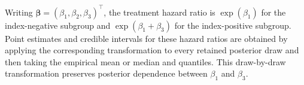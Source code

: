 Writing $\boldsymbol\beta=(\beta_1,\beta_2,\beta_3)^\top$, the treatment
hazard ratio is $\exp(\beta_1)$ for the index-negative subgroup and
$\exp(\beta_1+\beta_3)$ for the index-positive subgroup. Point estimates and
credible intervals for these hazard ratios are obtained by applying the
corresponding transformation to every retained posterior draw and then taking
the empirical mean or median and quantiles. This draw-by-draw transformation
preserves posterior dependence between $\beta_1$ and $\beta_3$.
